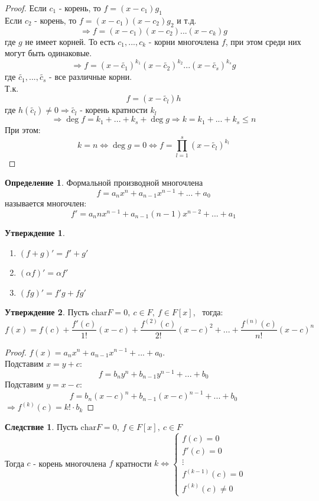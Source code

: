\documentclass[a4paper, 12pt]{article}
\newcommand\tab[1][.5cm]{\hspace*{#1}}
\theoremstyle{definition}
\newtheorem*{definition}{Определение}
\newtheorem*{consequense}{Следствие}
\newtheorem*{subtheorem}{Утверждение}
\begin{document}
  \begin{proof}
    Если $c_1$ - корень, то $f = (x-c_1)g_1$ \\
    \tab[4.1cm]Если $c_2$ - корень, то $f = (x-c_1)(x-c_2)g_2$ и т.д. 
    $$\Longrightarrow f = (x-c_1)(x-c_2)...(x-c_k)g$$
    где $g$ не имеет корней. То есть $c_1,...,c_k$ - корни многочлена $f$, при этом среди них могут быть одинаковые.
    $$\Longrightarrow f = (x-\widetilde{c_1})^{k_1}(x-\widetilde{c_2})^{k_2}...(x-\widetilde{c_s})^{k_s}g$$
    где $\widetilde{c_1},...,\widetilde{c_s}$ - все различные корни.\\ 
    Т.к. $$f = (x-\widetilde{c_l})h$$ 
    где $h(\widetilde{c_l}) \neq 0 \Longrightarrow \widetilde{c_l}$ - корень кратности $k_l$ $$\Longrightarrow \deg f = k_1 +...+k_s + \deg g \Longrightarrow k = k_1+...+k_s \leq n$$
    При этом: $$k=n \Longleftrightarrow \deg g =0 \Longleftrightarrow f = \prod\limits_{l=1}^{s}(x-\widetilde{c_l})^{k_l}$$       
  \end{proof}
  \begin{definition}
    Формальной производной многочлена 
    $$f = a_nx^n + a_{n-1}x^{n-1} + ... + a_0$$
    называется многочлен:
    $$f' = a_nnx^{n-1} + a_{n-1}(n-1)x^{n-2} + ... + a_1$$  
  \end{definition}
  \begin{subtheorem}\tab
    \begin{enumerate}
      \item $(f+g)' = f'+g'$
      \item $(\alpha f)' = \alpha f'$
      \item $(fg)' = f'g+fg'$   
    \end{enumerate}
  \end{subtheorem}
  \begin{subtheorem}
    Пусть $\textrm{char} F = 0, \ c \in F, \ f \in F[x]$, \ тогда: 
    $$f(x)=f(c) + \frac{f'(c)}{1!}(x-c) + \frac{f^{(2)}(c)}{2!}(x-c)^2 + ... + \frac{f^{(n)}(c)}{n!}(x-c)^n$$ 
  \end{subtheorem}
  \begin{proof}
    $f(x) = a_nx^n + a_{n-1}x^{n-1} + ... + a_0$.\\ Подставим $x = y+c$: 
    $$f = b_ny^n + b_{n-1}y^{n-1} + ... + b_0$$
    Подставим $y = x - c$:
    $$f = b_n(x-c)^n + b_{n-1}(x-c)^{n-1} + ... + b_0$$ 
    $\Longrightarrow f^{(k)}(c) = k! \cdot b_k$
  \end{proof}
  \begin{consequense}
    Пусть $\textrm{char} F = 0, \ f \in F[x], \ c\in F$\\
    Тогда $c$ - корень многочлена $f$ кратности $k \Longleftrightarrow \begin{cases}
      f(c) = 0\\
      f'(c) = 0\\
      \vdots \\
      f^{(k-1)}(c) = 0\\
      f^{(k)}(c) \neq 0
    \end{cases}$    
  \end{consequense}    
\end{document}
